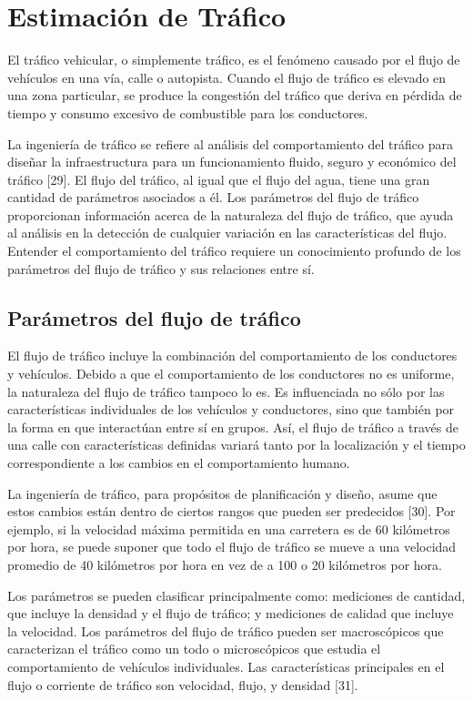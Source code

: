 \chapter{Estimación de Tráfico}

El tráfico vehicular, o simplemente tráfico, es el fenómeno causado por el flujo de vehículos en una vía, calle o autopista. Cuando el flujo de tráfico es elevado en una zona particular, se produce la congestión del tráfico que deriva en pérdida de tiempo y consumo excesivo de combustible para los conductores.

La ingeniería de tráfico se refiere al análisis del comportamiento del tráfico para diseñar la infraestructura para un funcionamiento fluido, seguro y económico del tráfico [29]. El flujo del tráfico, al igual que el flujo del agua, tiene una gran cantidad de parámetros asociados a él. Los parámetros del flujo de tráfico proporcionan información acerca de la naturaleza del flujo de tráfico, que ayuda al análisis en la detección de cualquier variación en las características del flujo. Entender el comportamiento del tráfico requiere un conocimiento profundo de los parámetros del flujo de tráfico y sus relaciones entre sí.

\section{Parámetros del flujo de tráfico}

El flujo de tráfico incluye la combinación del comportamiento de los conductores y vehículos. Debido a que el comportamiento de los conductores no es uniforme, la naturaleza del flujo de tráfico tampoco lo es. Es influenciada no sólo por las características individuales de los vehículos y conductores, sino que también por la forma en que interactúan entre sí en grupos. Así, el flujo de tráfico a través de una calle con características definidas variará tanto por la localización y el tiempo correspondiente a los cambios en el comportamiento humano.

La ingeniería de tráfico, para propósitos de planificación y diseño, asume que estos cambios están dentro de ciertos rangos que pueden ser predecidos [30]. Por ejemplo, si la velocidad máxima permitida en una carretera es de 60 kilómetros por hora, se puede suponer que todo el flujo de tráfico se mueve a una velocidad promedio de 40 kilómetros por hora en vez de a 100 o 20 kilómetros por hora. 

Los parámetros se pueden clasificar principalmente como: mediciones de cantidad, que incluye la densidad y el flujo de tráfico; y mediciones de calidad que incluye la velocidad. Los parámetros del flujo de tráfico pueden ser macroscópicos que caracterizan el tráfico como un todo o microscópicos que estudia el comportamiento de vehículos individuales. Las características principales en el flujo o corriente de tráfico son velocidad, flujo, y densidad [31].


